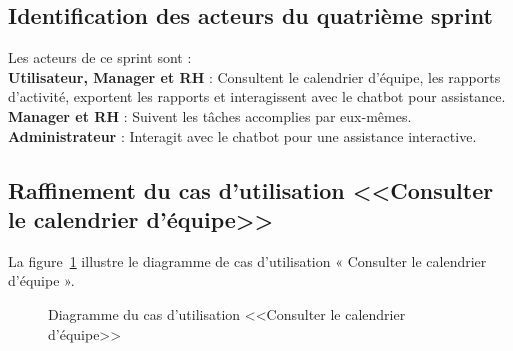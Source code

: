 \subsection{Identification des acteurs du quatrième sprint}
Les acteurs de ce sprint sont : \\
    \textbf{Utilisateur, Manager et RH} : Consultent le calendrier d’équipe, les rapports d’activité, exportent les rapports et interagissent avec le chatbot pour assistance. \\
    \textbf{Manager et RH} : Suivent les tâches accomplies par eux-mêmes. \\
    \textbf{Administrateur} : Interagit avec le chatbot pour une assistance interactive. \\
    \subsection{Raffinement du cas d'utilisation <<Consulter le calendrier d’équipe>>}
    La figure~\ref{fig:cal_equipe} illustre le diagramme de cas d’utilisation « Consulter le calendrier d’équipe ».
    \begin{figure}[h]
        \centering
        \caption{Diagramme du cas d'utilisation <<Consulter le calendrier d’équipe>>}
        \label{fig:cal_equipe}
    \end{figure}
    \newpage
